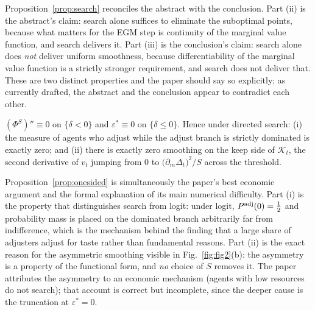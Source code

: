 Proposition~\ref{prop:search} reconciles the abstract with the conclusion. Part (ii) is
the abstract's claim: search alone suffices to eliminate the suboptimal points, because
what matters for the EGM step is continuity of the marginal value function, and search
delivers it. Part (iii) is the conclusion's claim: search alone does \emph{not} deliver
uniform smoothness, because differentiability of the marginal value function is a
strictly stronger requirement, and search does not deliver that. These are two
distinct properties and the paper should say so explicitly; as currently drafted, the
abstract and the conclusion appear to contradict each other.

\begin{proposition}
\label{prop:onesided}
$(\Phi^{S})''\equiv0$ on $\{\delta<0\}$ and $\varepsilon^{\ast}\equiv0$ on
$\{\delta\le0\}$. Hence under directed search: (i) the measure of agents who adjust
while the adjust branch is strictly dominated is exactly zero; and (ii) there is
exactly zero smoothing on the keep side of $\mathcal{K}_t$, the second derivative of
$v_t$ jumping from $0$ to $\big(\partial_m\Delta_t\big)^{2}/S$ across the threshold.
\end{proposition}

Proposition~\ref{prop:onesided} is simultaneously the paper's best economic argument
and the formal explanation of its main numerical difficulty. Part (i) is the property
that distinguishes search from logit: under logit, $P^{\mathrm{adj}}(0)=\tfrac12$ and
probability mass is placed on the dominated branch arbitrarily far from indifference,
which is the mechanism behind the finding that a large share of adjusters adjust for
taste rather than fundamental reasons. Part (ii) is the exact reason for the asymmetric
smoothing visible in Fig.~\ref{fig:fig2}(b): the asymmetry is a property of the
functional form, and \emph{no} choice of $S$ removes it. The paper attributes the
asymmetry to an economic mechanism (agents with low resources do not search); that
account is correct but incomplete, since the deeper cause is the truncation at
$\varepsilon^{\ast}=0$.

